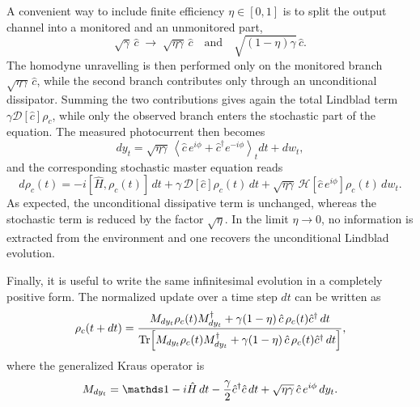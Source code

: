 A convenient way to include finite efficiency \(\eta \in [0,1]\) is to split the output channel into a monitored and an unmonitored part,
\begin{equation}
	\sqrt{\gamma}\,\hat c
	\;\longrightarrow\;
	\sqrt{\eta\gamma}\,\hat c
	\quad\text{and}\quad
	\sqrt{(1-\eta)\gamma}\,\hat c.
	\label{eq:homodyne_efficiency_split_channel}
\end{equation}
The homodyne unravelling is then performed only on the monitored branch \(\sqrt{\eta\gamma}\,\hat c\), while the second branch contributes only through an unconditional dissipator. Summing the two contributions gives again the total Lindblad term \(\gamma\mathcal{D}[\hat c]\rho_c\), while only the observed branch enters the stochastic part of the equation. The measured photocurrent then becomes
\begin{equation}
	dy_t
	=
	\sqrt{\eta\gamma}\,
	\left\langle
	\hat c\,e^{i\phi}+\hat c^\dagger e^{-i\phi}
	\right\rangle_t dt
	+
	dw_t,
	\label{eq:homodyne_record_statistics_inefficient}
\end{equation}
and the corresponding stochastic master equation reads
\begin{equation}
	d\rho_c(t)
	=
	-i[\hat H,\rho_c(t)]\,dt
	+
	\gamma\,\mathcal{D}[\hat c]\rho_c(t)\,dt
	+
	\sqrt{\eta\gamma}\,
	\mathcal{H}\!\left[\hat c\,e^{i\phi}\right]\rho_c(t)\,dw_t.
	\label{eq:homodyne_sme_wiener_form_inefficient}
\end{equation}
As expected, the unconditional dissipative term is unchanged, whereas the stochastic term is reduced by the factor \(\sqrt{\eta}\). In the limit \(\eta\to 0\), no information is extracted from the environment and one recovers the unconditional Lindblad evolution.

Finally, it is useful to write the same infinitesimal evolution in a completely positive form. The normalized update over a time step \(dt\) can be written as
\begin{equation}
	\rho_c(t+dt)
	=
	\frac{
		M_{dy_t}\rho_c(t)M_{dy_t}^\dagger
		+
		\gamma(1-\eta)\,\hat c\,\rho_c(t)\hat c^\dagger\,dt
	}{
		\Tr\!\left[
		M_{dy_t}\rho_c(t)M_{dy_t}^\dagger
		+
		\gamma(1-\eta)\,\hat c\,\rho_c(t)\hat c^\dagger\,dt
		\right]
	},
	\label{eq:homodyne_cp_update}
\end{equation}
where the generalized Kraus operator is
\begin{equation}
	M_{dy_t}
	=
	\id
	-
	i\hat H\,dt
	-
	\frac{\gamma}{2}\hat c^\dagger \hat c\,dt
	+
	\sqrt{\eta\gamma}\,\hat c\,e^{i\phi}\,dy_t.
	\label{eq:homodyne_generalized_kraus_operator}
\end{equation}

